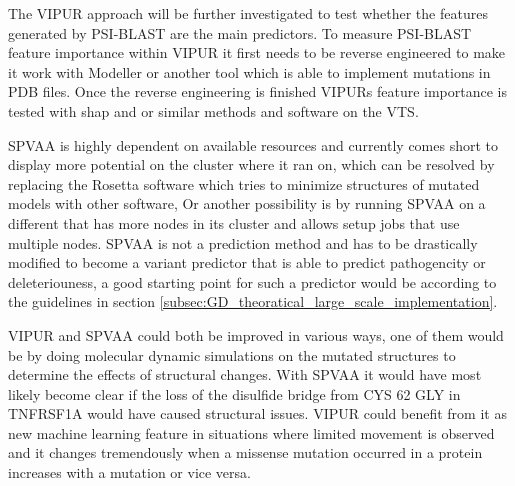 The VIPUR approach will be further investigated to test whether the features generated by PSI-BLAST are the main predictors. To measure PSI-BLAST feature importance within VIPUR it first needs to be reverse engineered to make it work with Modeller or another tool which is able to implement mutations in PDB files. Once the reverse engineering is finished VIPURs feature importance is tested with shap\cite{slundberg_slundberg/shap:_nodate, strumbelj_explaining_2014, ribeiro_why_2016, shrikumar_learning_2017, datta_algorithmic_nodate, bach_pixel-wise_2015, datadive_interpreting_nodate} and or similar methods and software on the VTS.

SPVAA is highly dependent on available resources and currently comes short to display more potential on the cluster where it ran on, which can be resolved by replacing the Rosetta software which tries to minimize structures of mutated models with other software, Or another possibility is by running SPVAA on a different that has more nodes in its cluster and allows setup jobs that use multiple nodes. SPVAA is not a prediction method and has to be drastically modified to become a variant predictor that is able to predict pathogencity or deleteriouness, a good starting point for such a predictor would be according to the guidelines in section \ref{subsec:GD_theoratical_large_scale_implementation}.

VIPUR and SPVAA could both be improved in various ways, one of them would be by doing molecular dynamic simulations on the mutated structures to determine the effects of structural changes. With SPVAA it would have most likely become clear if the loss of the disulfide bridge from CYS 62 GLY  in TNFRSF1A would have caused structural issues. VIPUR could benefit from it as new machine learning feature in situations where limited movement is observed and it changes tremendously when a missense mutation occurred in a protein increases with a mutation or vice versa.



